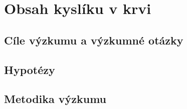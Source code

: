 \section{Obsah kyslíku v krvi} %
\subsection{Cíle výzkumu a výzkumné otázky}
\subsection{Hypotézy}
\subsection{Metodika výzkumu}